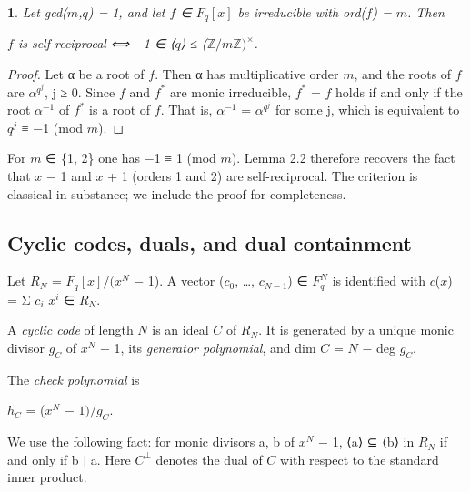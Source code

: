 \documentclass[pdflatex,sn-mathphys-num]{sn-jnl}
\theoremstyle{thmstyleone}
\newcommand{\thmxname}{}
\newtheorem*{thmxinner}{\thmxname}
\newenvironment{thmx}[1]{\renewcommand{\thmxname}{#1}\begin{thmxinner}}{\end{thmxinner}}
\theoremstyle{thmstylethree}
\begin{document}
\begin{thmx}{Lemma 2.2 (self-reciprocal irreducible factors)}

Let gcd(\(m\),\(q\)) = 1, and let \(f\) ∈ \(F_q[x]\) be irreducible with ord(\(f\)) = \(m\). Then

\begin{center}\(f\) is self-reciprocal ⟺ −1 ∈ ⟨\(q\)⟩ ≤ (\(ℤ/mℤ)^×\).\end{center}

\end{thmx}

\begin{proof}[Proof]

Let α be a root of \(f\). Then α has multiplicative order \(m\), and the roots of \(f\) are \(α^{q^j}\), j ≥ 0. Since \(f\) and \(f^{*}\) are monic irreducible, \(f^{*}\) = \(f\) holds if and only if the root \(α^{−1}\) of \(f^{*}\) is a root of \(f\). That is, \(α^{−1}\) = \(α^{q^j}\) for some j, which is equivalent to \(q^j\) ≡ −1 (mod \(m\)).

\end{proof}

For \(m\) ∈ \{1, 2\} one has −1 ≡ 1 (mod \(m\)). Lemma 2.2 therefore recovers the fact that \(x\) − 1 and \(x\) + 1 (orders 1 and 2) are self-reciprocal. The criterion is classical in substance; we include the proof for completeness.

\subsection{Cyclic codes, duals, and dual containment}

Let \(R_N\) = \(F_q[x]/(x^N\) − 1). A vector (\(c_0\), \ldots, \(c_{N−1}\)) ∈ \(F_q^N\) is identified with \(c\)(\(x\)) = Σ \(c_i\) \(x^i\) ∈ \(R_N\).

A \emph{cyclic code} of length \(N\) is an ideal \(C\) of \(R_N\). It is generated by a unique monic divisor \(g_C\) of \(x^N\) − 1, its \emph{generator polynomial}, and dim \(C\) = \(N\) − deg \(g_C\).

The \emph{check polynomial} is

\begin{center}\(h_C\) = (\(x^N\) − \(1)/g_C\).\end{center}

We use the following fact: for monic divisors a, b of \(x^N\) − 1, ⟨a⟩ ⊆ ⟨b⟩ in \(R_N\) if and only if b \(\mid\) a. Here \(C^⊥\) denotes the dual of \(C\) with respect to the standard inner product.
\end{document}
